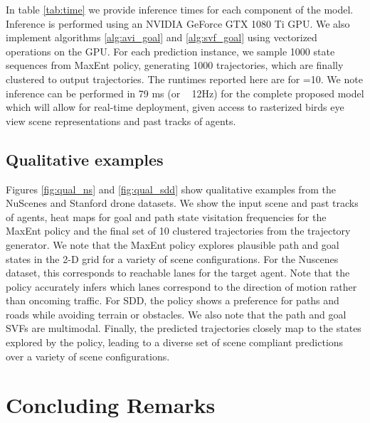 \documentclass[journal]{IEEEtran}
\begin{document}
In table \ref{tab:time} we provide inference times for each component of the model. Inference is performed using an NVIDIA GeForce GTX 1080 Ti GPU. We also implement algorithms \ref{alg:avi_goal} and \ref{alg:svf_goal} using vectorized operations on the GPU. For each prediction instance, we sample 1000 state sequences from MaxEnt policy, generating 1000 trajectories, which are finally clustered to output  trajectories. The runtimes reported here are for =10. We note inference can be performed in 79 ms (or ~ 12Hz) for the complete proposed model which will allow for real-time deployment, given access to rasterized birds eye view scene representations and past tracks of agents.




\subsection{Qualitative examples}
\label{sec:qual}
Figures \ref{fig:qual_ns} and \ref{fig:qual_sdd} show qualitative examples from the NuScenes and Stanford drone datasets. We show the input scene and past tracks of agents, heat maps for goal and path state visitation frequencies for the MaxEnt policy and the final set of 10 clustered trajectories from the trajectory generator. We note that the MaxEnt policy explores plausible path and goal states in the 2-D grid for a variety of scene configurations. For the Nuscenes dataset, this corresponds to reachable lanes for the target agent. Note that the policy accurately infers which lanes correspond to the direction of motion rather than oncoming traffic. For SDD, the policy shows a preference for paths and roads while avoiding terrain or obstacles. We also note that the path and goal SVFs are multimodal. Finally, the predicted trajectories closely map to the states explored by the policy, leading to a diverse set of scene compliant predictions over a variety of scene configurations.   


\section{Concluding Remarks}
\end{document}
